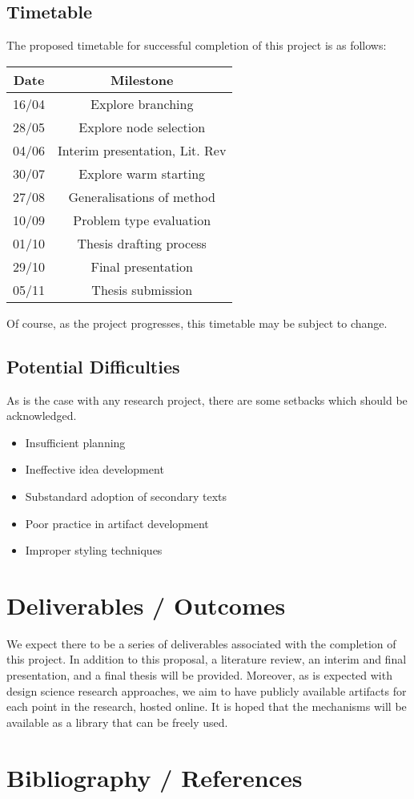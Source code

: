 \documentclass[12pt, a4paper]{article}
\begin{document}
\subsection{Timetable}
The proposed timetable for successful completion of this project is as follows:

\begin{center}
  \begin{tabular}{||c | c||}
  \hline
  Date & Milestone \\ [0.5ex]
  \hline\hline
  16/04 & Explore branching \\
  \hline
  28/05 & Explore node selection \\
  \hline
  04/06 & Interim presentation, Lit. Rev  \\
  \hline
  30/07 & Explore warm starting \\
  \hline
  27/08 & Generalisations of method \\
  \hline
  10/09 & Problem type evaluation \\
  \hline
  01/10 & Thesis drafting process \\
  \hline
  29/10 & Final presentation \\
  \hline 
  05/11 & Thesis submission \\ [1ex]
  \hline
  \end{tabular}
\end{center}

Of course, as the project progresses, this timetable may be subject to change.

\subsection{Potential Difficulties}
As is the case with any research project, there are some setbacks which should be acknowledged.
\begin{itemize}
  \item Insufficient planning
  \item Ineffective idea development
  \item Substandard adoption of secondary texts
  \item Poor practice in artifact development
  \item Improper styling techniques
\end{itemize}

\section{Deliverables / Outcomes}
We expect there to be a series of deliverables associated with the completion of this project. In addition to this proposal, a literature review, an interim and final presentation, and a final thesis will be provided. Moreover, as is expected with design science research approaches, we aim to have publicly available artifacts for each point in the research, hosted online. It is hoped that the mechanisms will be available as a library that can be freely used.

\section{Bibliography / References}


\end{document}
